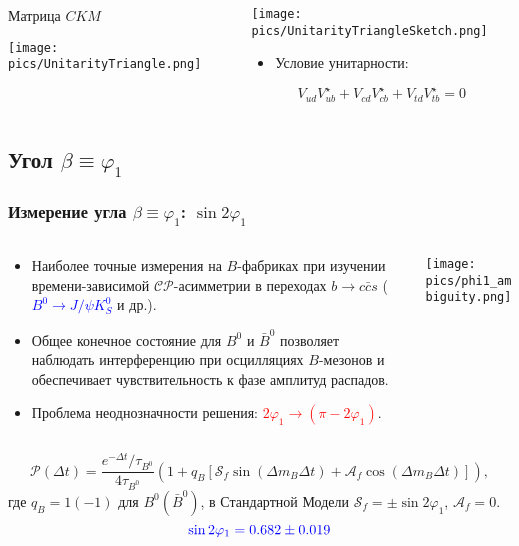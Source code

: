 \documentclass[10 pt,compress,mathserif]{beamer}
\newcommand{\sinbeta}{\ensuremath{\sin{2\varphi_1}}\xspace}
\newcommand{\cpconj}{\ensuremath{\mathcal{CP}}\xspace}
\begin{document}
\begin{frame}
\begin{small}
\begin{columns}
\begin{column}{0.6\textwidth}
\begin{block}{Матрица $CKM$}
  \end{block}
  \texttt{[image: pics/UnitarityTriangle.png]}
 \end{column}
 \begin{column}{0.4\textwidth}
  \texttt{[image: pics/UnitarityTriangleSketch.png]}

  \begin{itemize}
   \item Условие унитарности:
  \end{itemize}
  \begin{equation*}
   V_{ud}V^{\star}_{ub}+V_{cd}V^{\star}_{cb}+V_{td}V^{\star}_{tb}=0
  \end{equation*}
 \end{column}
 \end{columns}
 \end{small}
\end{frame}

\subsection{Угол $\beta\equiv\varphi_1$}
\begin{frame}
 \frametitle{Измерение угла $\beta\equiv\varphi_1$: \sinbeta}
 \begin{small}
 \begin{columns}
  \begin{column}{0.5\textwidth}
  \begin{itemize}
   \item Наиболее точные измерения на $B$-фабриках при изучении времени-зависимой \cpconj-асимметрии в переходах $b\to c\bar c s$ (\textcolor{blue}{$B^0\to J/\psi K_S^0$} и др.).
   \item Общее конечное состояние для $B^0$ и $\bar B^0$ позволяет наблюдать интерференцию при осцилляциях $B$-мезонов и обеспечивает чувствительность к фазе амплитуд распадов.
   \item Проблема неоднозначности решения: \textcolor{red}{$2\varphi_1\to (\pi-2\varphi_1)$}.
  \end{itemize}
  \end{column}
  \begin{column}{0.5\textwidth}
   \texttt{[image: pics/phi1\_ambiguity.png]}
  \end{column}
 \end{columns}

 \begin{equation*}
    \mathcal{P}(\Delta t) = \frac{e^{-\Delta t}/\tau_{B^{0}}}{4\tau_{B^0}}\left(1+q_B\left[\mathcal{S}_f\sin(\Delta m_B\Delta t)+\mathcal{A}_f\cos(\Delta m_B\Delta t)\right]\right),
 \end{equation*}
 где $q_B=1 (-1)$ для $B^0 (\bar B^0)$, в Стандартной Модели $\mathcal{S}_f=\pm\sinbeta$, $\mathcal{A}_f=0$.
 \begin{equation*}
  \textcolor{blue}{\sinbeta = 0.682 \pm 0.019}
 \end{equation*}
\end{small}
\end{frame}
\end{document}
